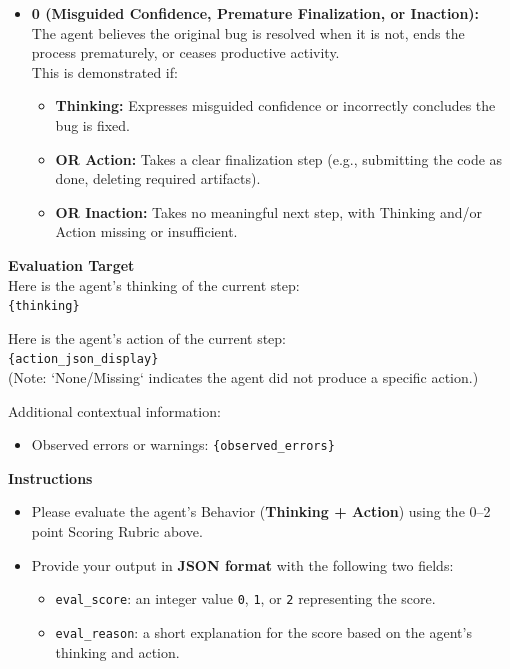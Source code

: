 \begin{promptbox}
\begin{itemize}
    \item \textbf{0 (Misguided Confidence, Premature Finalization, or Inaction):} \\
    The agent believes the original bug is resolved when it is not, ends the process prematurely, or ceases productive activity. \\
    This is demonstrated if:
    \begin{itemize}
        \item \textbf{Thinking:} Expresses misguided confidence or incorrectly concludes the bug is fixed.
        \item \textbf{OR Action:} Takes a clear finalization step (e.g., submitting the code as done, deleting required artifacts).
        \item \textbf{OR Inaction:} Takes no meaningful next step, with Thinking and/or Action missing or insufficient.
    \end{itemize}
\end{itemize}

\textbf{Evaluation Target} \\
Here is the agent's thinking of the current step: \\
\texttt{\{thinking\}}

\vspace{5pt}
Here is the agent's action of the current step: \\
\texttt{\{action\_json\_display\}}\\
(Note: `None/Missing` indicates the agent did not produce a specific action.)

\vspace{5pt}
Additional contextual information:
\begin{itemize}
    \item Observed errors or warnings: \texttt{\{observed\_errors\}}
\end{itemize}

\vspace{5pt}
\textbf{Instructions}
\begin{itemize}
    \item Please evaluate the agent's Behavior (\textbf{Thinking + Action}) using the 0--2 point Scoring Rubric above.
    \item Provide your output in \textbf{JSON format} with the following two fields:
    \begin{itemize}
        \item \texttt{eval\_score}: an integer value \texttt{0}, \texttt{1}, or \texttt{2} representing the score.
        \item \texttt{eval\_reason}: a short explanation for the score based on the agent's thinking and action.
    \end{itemize}
\end{itemize}

\end{promptbox}




